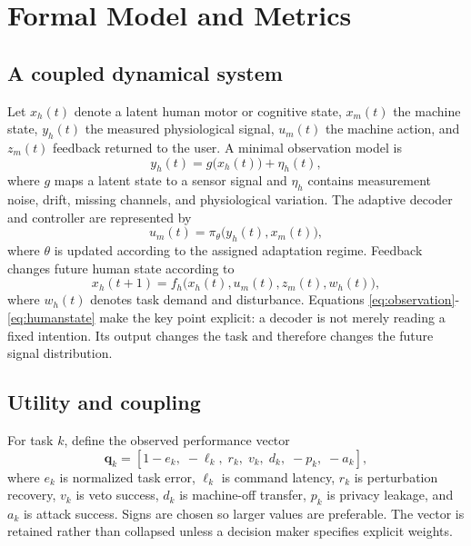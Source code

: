 \documentclass[conference]{IEEEtran}
\begin{document}
\section{Formal Model and Metrics}

\subsection{A coupled dynamical system}

Let $x_h(t)$ denote a latent human motor or cognitive state, $x_m(t)$ the machine state, $y_h(t)$ the measured physiological signal, $u_m(t)$ the machine action, and $z_m(t)$ feedback returned to the user. A minimal observation model is
\begin{equation}
y_h(t)=g\bigl(x_h(t)\bigr)+\eta_h(t),
\label{eq:observation}
\end{equation}
where $g$ maps a latent state to a sensor signal and $\eta_h$ contains measurement noise, drift, missing channels, and physiological variation. The adaptive decoder and controller are represented by
\begin{equation}
u_m(t)=\pi_{\theta}\bigl(y_h(t),x_m(t)\bigr),
\label{eq:controller}
\end{equation}
where $\theta$ is updated according to the assigned adaptation regime. Feedback changes future human state according to
\begin{equation}
x_h(t+1)=f_h\bigl(x_h(t),u_m(t),z_m(t),w_h(t)\bigr),
\label{eq:humanstate}
\end{equation}
where $w_h(t)$ denotes task demand and disturbance. Equations \eqref{eq:observation}-\eqref{eq:humanstate} make the key point explicit: a decoder is not merely reading a fixed intention. Its output changes the task and therefore changes the future signal distribution.

\subsection{Utility and coupling}

For task $k$, define the observed performance vector
\begin{equation}
\mathbf{q}_k=\left[1-e_k,\; -\ell_k,\; r_k,\; v_k,\; d_k,\; -p_k,\; -a_k\right],
\label{eq:utility}
\end{equation}
where $e_k$ is normalized task error, $\ell_k$ is command latency, $r_k$ is perturbation recovery, $v_k$ is veto success, $d_k$ is machine-off transfer, $p_k$ is privacy leakage, and $a_k$ is attack success. Signs are chosen so larger values are preferable. The vector is retained rather than collapsed unless a decision maker specifies explicit weights.
\end{document}
